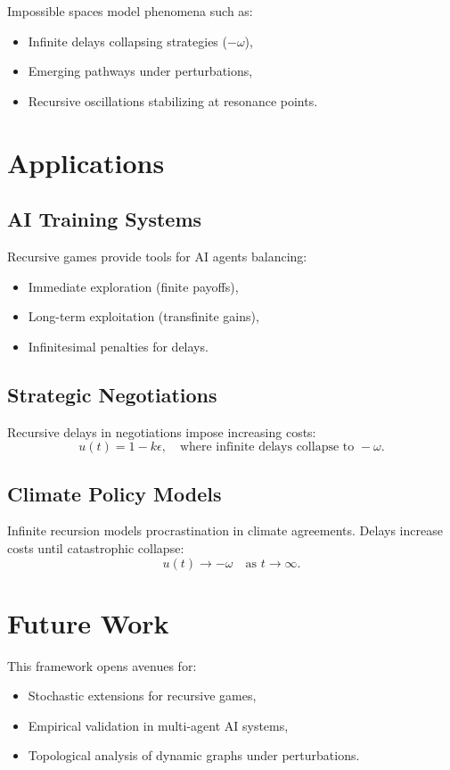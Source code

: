 \documentclass[12pt]{article}
\begin{document}
Impossible spaces model phenomena such as:
\begin{itemize}
    \item Infinite delays collapsing strategies (\(-\omega\)),
    \item Emerging pathways under perturbations,
    \item Recursive oscillations stabilizing at resonance points.
\end{itemize}

\section{Applications}
\subsection{AI Training Systems}
Recursive games provide tools for AI agents balancing:
\begin{itemize}
    \item Immediate exploration (finite payoffs),
    \item Long-term exploitation (transfinite gains),
    \item Infinitesimal penalties for delays.
\end{itemize}

\subsection{Strategic Negotiations}
Recursive delays in negotiations impose increasing costs:
\[
u(t) = 1 - k\epsilon, \quad \text{where infinite delays collapse to } -\omega.
\]

\subsection{Climate Policy Models}
Infinite recursion models procrastination in climate agreements. Delays increase costs until catastrophic collapse:
\[
u(t) \to -\omega \quad \text{as } t \to \infty.
\]

\section{Future Work}
This framework opens avenues for:
\begin{itemize}
    \item Stochastic extensions for recursive games,
    \item Empirical validation in multi-agent AI systems,
    \item Topological analysis of dynamic graphs under perturbations.
\end{itemize}
\end{document}
